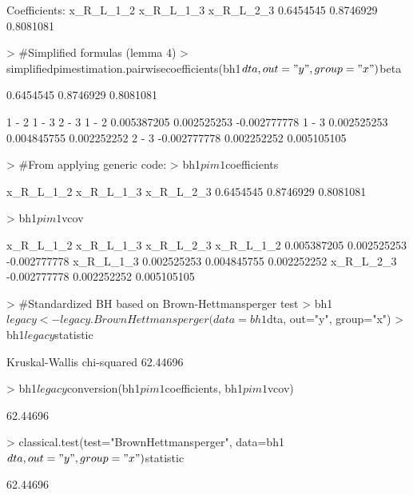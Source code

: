 \documentclass[12pt]{article}
\begin{document}
\begin{Schunk}
\begin{Soutput}
Coefficients:
x_R_L_1_2 x_R_L_1_3 x_R_L_2_3 
0.6454545 0.8746929 0.8081081 
\end{Soutput}
\begin{Sinput}
> 	#Simplified formulas (lemma 4)
> 	simplifiedpimestimation.pairwisecoefficients(bh1$dta, out="y", group="x")$beta
\end{Sinput}
\begin{Soutput}
[1] 0.6454545 0.8746929 0.8081081
\end{Soutput}
\begin{Soutput}
             1 - 2       1 - 3        2 - 3
1 - 2  0.005387205 0.002525253 -0.002777778
1 - 3  0.002525253 0.004845755  0.002252252
2 - 3 -0.002777778 0.002252252  0.005105105
\end{Soutput}
\begin{Sinput}
> 	#From applying generic code:
> 	bh1$pim1$coefficients
\end{Sinput}
\begin{Soutput}
x_R_L_1_2 x_R_L_1_3 x_R_L_2_3 
0.6454545 0.8746929 0.8081081 
\end{Soutput}
\begin{Sinput}
> 	bh1$pim1$vcov
\end{Sinput}
\begin{Soutput}
             x_R_L_1_2   x_R_L_1_3    x_R_L_2_3
x_R_L_1_2  0.005387205 0.002525253 -0.002777778
x_R_L_1_3  0.002525253 0.004845755  0.002252252
x_R_L_2_3 -0.002777778 0.002252252  0.005105105
\end{Soutput}
\begin{Sinput}
> 	#Standardized BH based on Brown-Hettmansperger test
> 	bh1$legacy<-legacy.BrownHettmansperger(data=bh1$dta, out="y", group="x")
> 	bh1$legacy$statistic
\end{Sinput}
\begin{Soutput}
Kruskal-Wallis chi-squared 
                  62.44696 
\end{Soutput}
\begin{Sinput}
> 	bh1$legacy$conversion(bh1$pim1$coefficients, bh1$pim1$vcov)
\end{Sinput}
\begin{Soutput}
         [,1]
[1,] 62.44696
\end{Soutput}
\begin{Sinput}
> 	classical.test(test="BrownHettmansperger", data=bh1$dta, out="y", group="x")$statistic
\end{Sinput}
\begin{Soutput}
         [,1]
[1,] 62.44696
\end{Soutput}
\end{Schunk}
\end{document}
